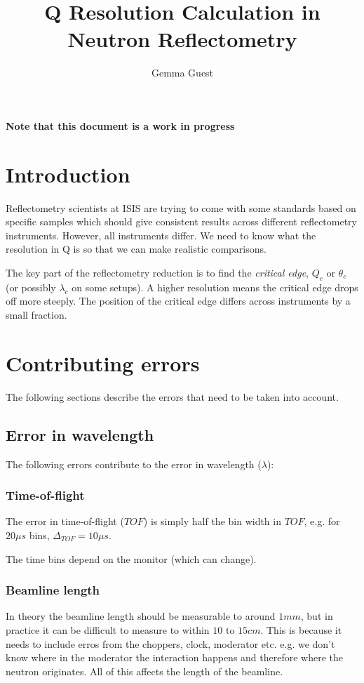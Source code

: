 \documentclass[12pt]{article}
\begin{document}
\title{Q Resolution Calculation in Neutron Reflectometry}
\author{Gemma Guest}
\maketitle

\textbf{\color{red} Note that this document is a work in progress}

\section{Introduction}
Reflectometry scientists at ISIS are trying to come with some standards based on specific samples which should give consistent results across different reflectometry instruments. However, all instruments differ. We need to know what the resolution in Q is so that we can make realistic comparisons.

The key part of the reflectometry reduction is to find the \emph{critical edge}, $Q_c$ or $\theta_c$ (or possibly $\lambda_c$ on some setups). A higher resolution means the critical edge drops off more steeply. The position of the critical edge differs across instruments by a small fraction.

\section{Contributing errors}
The following sections describe the errors that need to be taken into account.

\subsection{Error in wavelength}

The following errors contribute to the error in wavelength ($\lambda$):

\subsubsection{Time-of-flight}
The error in time-of-flight ($TOF$) is simply half the bin width in $TOF$, e.g. for $20\mu s$ bins, $\Delta_{TOF}=10\mu s$.

The time bins depend on the monitor (which can change).

\subsubsection{Beamline length}
In theory the beamline length should be measurable to around $1mm$, but in practice it can be difficult to measure to within $10$ to $15cm$. This is because it needs to include erros from the choppers, clock, moderator etc. e.g. we don't know where in the moderator the interaction happens and therefore where the neutron originates. All of this affects the length of the beamline.
\end{document}
